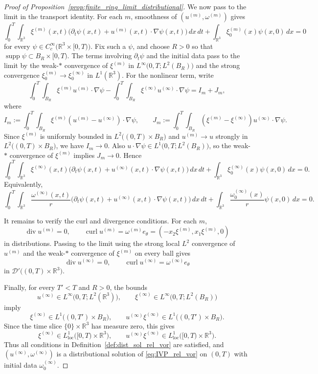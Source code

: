 \documentclass[reqno,11pt]{amsart}
\begin{document}
\begin{proof}[Proof of Proposition~\ref{prop:finite_ring_limit_distributional}]
We now pass to the limit in the transport identity. For each \(m\), smoothness of
\((u^{(m)},\omega^{(m)})\) gives
\[
\int_0^T\int_{\mathbb{R}^3}\xi^{(m)}(x,t)
\bigl(\partial_t\psi(x,t)+u^{(m)}(x,t)\cdot\nabla\psi(x,t)\bigr)\,dx\,dt
+\int_{\mathbb{R}^3}\xi_0^{(m)}(x)\psi(x,0)\,dx=0
\]
for every \(\psi\in C_c^\infty\big(\mathbb{R}^3\times[0,T)\big)\). Fix such a \(\psi\), and choose
\(R>0\) so that \(\operatorname{supp}\psi\subset B_R\times[0,T)\). The terms involving
\(\partial_t\psi\) and the initial data pass to the limit by the weak-\(*\) convergence
of \(\xi^{(m)}\) in \(L^\infty\big(0,T;L^2(B_R)\big)\) and the strong convergence
\(\xi_0^{(m)}\to\xi_0^{(\infty)}\) in \(L^1(\mathbb{R}^3)\). For the nonlinear term, write
\[
\int_0^T\int_{B_R}\xi^{(m)}u^{(m)}\cdot\nabla\psi
-
\int_0^T\int_{B_R}\xi^{(\infty)} u^{(\infty)}\cdot\nabla\psi
=
I_m+J_m,
\]
where
\[
I_m:=\int_0^T\int_{B_R}\xi^{(m)}(u^{(m)}-u^{(\infty)})\cdot\nabla\psi,
\qquad
J_m:=\int_0^T\int_{B_R}(\xi^{(m)}-\xi^{(\infty)})u^{(\infty)}\cdot\nabla\psi.
\]
Since \(\xi^{(m)}\) is uniformly bounded in \(L^2\big((0,T)\times B_R\big)\) and
\(u^{(m)}\to u\) strongly in \(L^2\big((0,T)\times B_R\big)\), we have \(I_m\to 0\). Also
\(u\cdot\nabla\psi\in L^1\big(0,T;L^2(B_R)\big)\), so the weak-\(*\) convergence of
\(\xi^{(m)}\) implies \(J_m\to 0\). Hence
\[
\int_0^T\int_{\mathbb{R}^3}\xi^{(\infty)}(x,t)
\bigl(\partial_t\psi(x,t)+u^{(\infty)}(x,t)\cdot\nabla\psi(x,t)\bigr)\,dx\,dt
+\int_{\mathbb{R}^3}\xi_0^{(\infty)}(x)\psi(x,0)\,dx=0.
\]
Equivalently,
\[
\int_0^T\int_{\mathbb{R}^3}\frac{\omega^{(\infty)}(x,t)}{r}
\bigl(\partial_t\psi(x,t)+u^{(\infty)}(x,t)\cdot\nabla\psi(x,t)\bigr)\,dx\,dt
+\int_{\mathbb{R}^3}\frac{\omega_0^{(\infty)}(x)}{r}\psi(x,0)\,dx=0.
\]

It remains to verify the curl and divergence conditions. For each \(m\),
\[
\operatorname{div}u^{(m)}=0,
\qquad
\operatorname{curl}u^{(m)}=\omega^{(m)}e_\theta
=
\left(-x_2\xi^{(m)},x_1\xi^{(m)},0\right)
\]
in distributions. Passing to the limit using the strong local \(L^2\) convergence of
\(u^{(m)}\) and the weak-\(*\) convergence of \(\xi^{(m)}\) on every ball gives
\[
\operatorname{div}u^{(\infty)}=0,
\qquad
\operatorname{curl}u^{(\infty)}=\omega^{(\infty)} e_\theta
\]
in \(\mathcal D'\big((0,T)\times\mathbb{R}^3\big)\).


Finally, for every \(T'<T\) and \(R>0\), the bounds
\[
u^{(\infty)}\in L^\infty\big(0,T;L^2(\mathbb R^3)\big),
\qquad
\xi^{(\infty)}\in L^\infty\big(0,T;L^2(B_R)\big)
\]
imply
\[
\xi^{(\infty)}\in L^1\big((0,T')\times B_R\big),
\qquad
u^{(\infty)}\xi^{(\infty)}\in L^1\big((0,T')\times B_R\big).
\]
Since the time slice \(\{0\}\times\mathbb R^3\) has measure zero, this gives
\[
\xi^{(\infty)}\in L^1_{\mathrm{loc}}\big([0,T)\times\mathbb R^3\big),
\qquad
u^{(\infty)}\xi^{(\infty)}\in L^1_{\mathrm{loc}}\big([0,T)\times\mathbb R^3\big).
\]
Thus all conditions in Definition~\ref{def:dist_sol_rel_vor} are satisfied, and
\((u^{(\infty)},\omega^{(\infty)})\) is a distributional solution of \eqref{eq:IVP_rel_vor} on \((0,T)\)
with initial data \(\omega_0^{(\infty)}\).
\end{proof}
\end{document}
